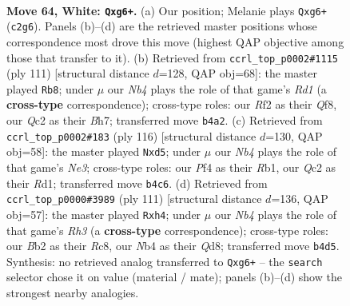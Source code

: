 \documentclass[11pt]{article}
\begin{document}
\clearpage

\begin{figure}[p]\centering
\begin{subfigure}{0.46\textwidth}\centering
\resizebox{\linewidth}{!}{%
\newchessgame
\chessboard[
  setfen={rn1qk1r1/6b1/6p1/3n2P1/1N1P1P1p/1R5P/1BQ2R1K/8 w - - 0 64},
  showmover=false,
  pgfstyle=straightmove, color=movearrow, markmove={c2-g6}
]}
\caption{}
\end{subfigure}\hfill
\begin{subfigure}{0.46\textwidth}\centering
\resizebox{\linewidth}{!}{%
\newchessgame
\chessboard[
  setfen={3r1q1k/7b/p3rn1p/P1pN1p2/5P2/4p2P/1Q2B3/3R2RK b - - 2 56},
  showmover=false,
  pgfstyle=straightmove, color=movearrow, markmove={d8-b8}
]}
\caption{}
\end{subfigure}
\\[4pt]
\begin{subfigure}{0.46\textwidth}\centering
\resizebox{\linewidth}{!}{%
\newchessgame
\chessboard[
  setfen={4r1k1/5pp1/3q4/n2p2P1/3PPn2/2r1NP2/5QB1/1R1R2K1 w - - 7 59},
  showmover=false,
  pgfstyle=straightmove, color=movearrow, markmove={e3-d5}
]}
\caption{}
\end{subfigure}\hfill
\begin{subfigure}{0.46\textwidth}\centering
\resizebox{\linewidth}{!}{%
\newchessgame
\chessboard[
  setfen={2rq1bk1/1R5p/2p4r/p2nBp2/3Pp2N/6P1/2R2P2/2Q3K1 b - - 3 56},
  showmover=false,
  pgfstyle=straightmove, color=movearrow, markmove={h6-h4}
]}
\caption{}
\end{subfigure}
\caption{\textbf{Move 64, White: \texttt{Qxg6+}.} (a) Our position; Melanie plays \texttt{Qxg6+} (\texttt{c2g6}). Panels (b)--(d) are the retrieved master positions whose correspondence most drove this move (highest QAP objective among those that transfer to it). (b) Retrieved from \texttt{ccrl\_top\_p0002\#1115} (ply 111) [structural distance $d$=128, QAP obj=68]: the master played \texttt{Rb8}; under $\mu$ our \emph{Nb4} plays the role of that game's \emph{Rd1} (a \textbf{cross-type} correspondence); cross-type roles: our \emph{R}f2 as their \emph{Q}f8, our \emph{Q}c2 as their \emph{B}h7; transferred move \texttt{b4a2}. (c) Retrieved from \texttt{ccrl\_top\_p0002\#183} (ply 116) [structural distance $d$=130, QAP obj=58]: the master played \texttt{Nxd5}; under $\mu$ our \emph{Nb4} plays the role of that game's \emph{Ne3}; cross-type roles: our \emph{P}f4 as their \emph{R}b1, our \emph{Q}c2 as their \emph{R}d1; transferred move \texttt{b4c6}. (d) Retrieved from \texttt{ccrl\_top\_p0000\#3989} (ply 111) [structural distance $d$=136, QAP obj=57]: the master played \texttt{Rxh4}; under $\mu$ our \emph{Nb4} plays the role of that game's \emph{Rh3} (a \textbf{cross-type} correspondence); cross-type roles: our \emph{B}b2 as their \emph{R}c8, our \emph{N}b4 as their \emph{Q}d8; transferred move \texttt{b4d5}. Synthesis: no retrieved analog transferred to \texttt{Qxg6+} -- the \texttt{search} selector chose it on value (material / mate); panels (b)--(d) show the strongest nearby analogies.}
\label{fig:thought-m126}
\end{figure}
\end{document}
